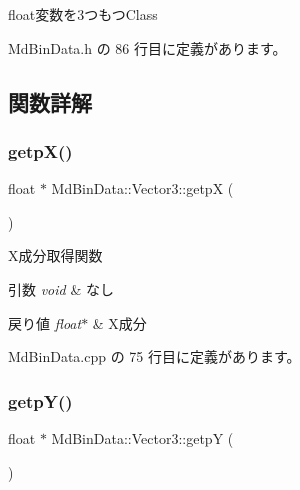 float変数を3つもつ\+Class 

 Md\+Bin\+Data.\+h の 86 行目に定義があります。



\subsection{関数詳解}
\mbox{\label{class_md_bin_data_1_1_vector3_a92662563dc33035c94d457cd96d7972e}} 
\subsubsection{\texorpdfstring{getp\+X()}{getpX()}}
{\footnotesize\ttfamily float $\ast$ Md\+Bin\+Data\+::\+Vector3\+::getpX (\begin{DoxyParamCaption}{ }\end{DoxyParamCaption})}



X成分取得関数 


\begin{DoxyParams}{引数}
{\em void} & なし \\
\hline
\end{DoxyParams}

\begin{DoxyRetVals}{戻り値}
{\em float$\ast$} & X成分 \\
\hline
\end{DoxyRetVals}


 Md\+Bin\+Data.\+cpp の 75 行目に定義があります。

\mbox{\label{class_md_bin_data_1_1_vector3_aaf3534a3038219e74875d002255e0c27}} 
\subsubsection{\texorpdfstring{getp\+Y()}{getpY()}}
{\footnotesize\ttfamily float $\ast$ Md\+Bin\+Data\+::\+Vector3\+::getpY (\begin{DoxyParamCaption}{ }\end{DoxyParamCaption})}




